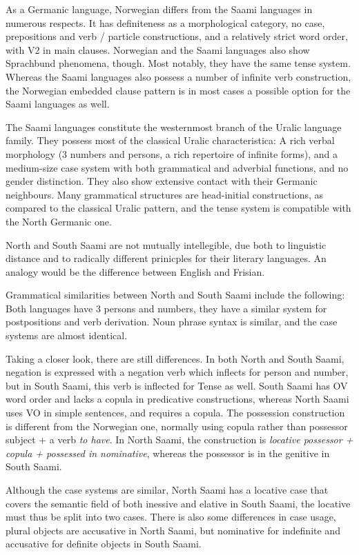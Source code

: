 \documentclass[a4paper,11pt,twocolumn]{article}
\begin{document}
As a Germanic language, Norwegian differs from the Saami languages
in numerous respects. It has definiteness as a morphological category,
no case, prepositions and verb / particle constructions, and a 
relatively strict word order, with V2 in main clauses. Norwegian
and the Saami languages also show Sprachbund phenomena, though.
Most notably, they have the same tense system. Whereas the Saami
languages also possess a number of infinite verb construction, the
Norwegian embedded clause pattern is in most cases a possible option
for the Saami languages as well.

The Saami languages constitute the westernmost branch of the Uralic
language family. They possess most of the classical Uralic
characteristica: A rich verbal morphology (3 numbers and persons, a
rich repertoire of infinite forms), and a medium-size case system with
both grammatical and adverbial functions, and no gender
distinction. They also show extensive contact with their Germanic
neighbours. Many grammatical structures are head-initial
constructions, as compared to the classical Uralic pattern, and the
tense system is compatible with the North Germanic one.

North and South Saami are not mutually intellegible, due both to
linguistic distance and to radically different prinicples for their
literary languages. An analogy would be the difference between English
and Frisian.

Grammatical similarities between North and South Saami include the
following: Both languages have 3 persons and numbers, they have a
similar system for postpositions and verb derivation. Noun phrase
syntax is similar, and the case systems are almost identical.

Taking a closer look, there are still differences. In both North and
South Saami, negation is expressed with a negation verb which inflects
for person and number, but in South Saami, this verb is inflected for
Tense as well. South Saami has OV word order and lacks a copula in
predicative constructions, whereas North Saami uses VO in simple
sentences, and requires a copula.  The possession construction is
different from the Norwegian one, normally using copula rather than
possessor subject + a verb \textit{to have}. In North Saami, the
construction is 
\textit{locative possessor + copula + possessed in nominative}, 
whereas the possessor is in the genitive in South
Saami.

Although the case systems are similar, North Saami has a locative case
that covers the semantic field of both inessive and elative in 
South Saami, the locative must thus be split into two cases. There is
also some differences in case usage, plural objects are accusative
in North Saami, but nominative for indefinite and accusative for 
definite objects in South Saami.
\end{document}

